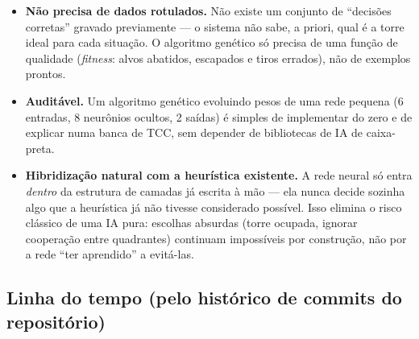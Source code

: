 \documentclass[11pt,a4paper]{article}
\begin{document}
\begin{itemize}[leftmargin=1.4em]
  \item \textbf{Não precisa de dados rotulados.} Não existe um conjunto de ``decisões corretas''
    gravado previamente — o sistema não sabe, a priori, qual é a torre ideal para cada situação.
    O algoritmo genético só precisa de uma função de qualidade (\emph{fitness}: alvos abatidos,
    escapados e tiros errados), não de exemplos prontos.
  \item \textbf{Auditável.} Um algoritmo genético evoluindo pesos de uma rede pequena (6 entradas,
    8 neurônios ocultos, 2 saídas) é simples de implementar do zero e de explicar numa banca de
    TCC, sem depender de bibliotecas de IA de caixa-preta.
  \item \textbf{Hibridização natural com a heurística existente.} A rede neural só entra
    \emph{dentro} da estrutura de camadas já escrita à mão — ela nunca decide sozinha algo que a
    heurística já não tivesse considerado possível. Isso elimina o risco clássico de uma IA
    pura: escolhas absurdas (torre ocupada, ignorar cooperação entre quadrantes) continuam
    impossíveis por construção, não por a rede ``ter aprendido'' a evitá-las.
\end{itemize}

\subsection{Linha do tempo (pelo histórico de commits do repositório)}
\end{document}

